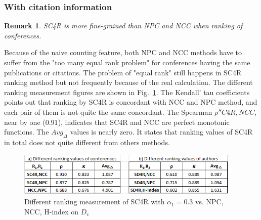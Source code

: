 \documentclass[10pt,leqno,twoside]{article}
\newtheorem{remark}{\indent Remark}[section]
\begin{document}
\subsubsection{With citation information}
%
%
\begin{remark}
SC4R is more fine-grained than NPC and NCC when ranking of conferences.
\end{remark}

Because of the naive counting feature, both NPC and NCC methods have to suffer from the "too many equal rank problem" for conferences having the same publications or citations. The problem of "equal rank" still happens in  SC4R ranking method but not frequently because of the real calculation.
The different ranking measurement figures are shown in Fig.~\ref{Fig:DiffRank}.
The Kendall' tau coefficients points out that ranking by SC4R is concordant with NCC and NPC method, and each pair of them is not quite the same concordant. The Spearman $\rho^SC4R,NCC$, near by one ($0.91$), indicates that SC4R and NCC are perfect monotonic functions.  The $Avg_\Delta$ values is nearly zero. It states that ranking values of SC4R in total does not quite different from others methods.

\begin{figure}
	\caption{Different ranking measurement of SC4R with $\alpha_1=0.3$ vs. NPC, NCC, H-index on $D_c$}
	\label{Fig:DiffRank}
    \centering
    \includegraphics[width=0.95\textwidth]{DiffRank}
\end{figure}
%
\end{document}
